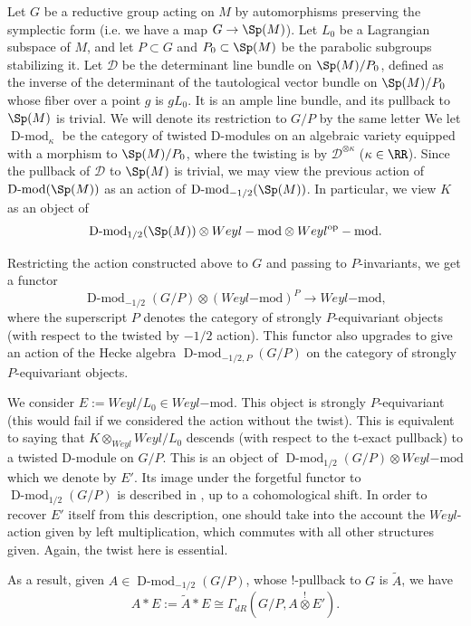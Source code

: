 \documentclass[11pt]{article}
\begin{document}
Let $G$ be a reductive group acting on $M$ by automorphisms preserving the symplectic form (i.e. we have a map $G\to \Sp(M)$).
Let $L_0$ be a Lagrangian subspace of $M$, and let $P\subset G$ and $P_0\subset \Sp(M)$ be the parabolic subgroups stabilizing it.
Let $\mathcal{D}$ be the determinant line bundle on $\Sp(M)/P_0$, defined as the inverse of the determinant of the tautological vector bundle on $\Sp(M)/P_0$ whose fiber over a point $g$ is $gL_0$. It is an ample line bundle, and its pullback to $\Sp(M)$ is trivial. We will denote its restriction to $G/P$ by the same letter
We let $\operatorname{D-mod}_\kappa$ be the category of twisted D-modules on an algebraic variety equipped with a morphism to $\Sp(M)/P_0$, where the twisting is by $\mathcal{D}^{\otimes\kappa}$ ($\kappa\in \RR$).
Since the pullback of $\mathcal{D}$ to $\Sp(M)$ is trivial, we may view the previous action of $\operatorname{D-mod}(\Sp(M))$ as an action of $\operatorname{D-mod}_{-1/2}(\Sp(M))$. In particular, we view $K$ as an object of $$\operatorname{D-mod}_{1/2}(\Sp(M))\otimes Weyl-\mathrm{mod}\otimes Weyl^{\mathrm{op}}-\mathrm{mod}.$$

Restricting the action constructed above to $G$ and passing to $P$-invariants, we get a functor $$\operatorname{D-mod}_{-1/2}(G/P)\otimes (Weyl\mathrm{-mod})^P\to Weyl\mathrm{-mod},$$ where the superscript $P$ denotes the category of strongly $P$-equivariant objects (with respect to the twisted by $-1/2$ action). This functor also upgrades to give an action of the Hecke algebra $\operatorname{D-mod}_{-1/2,P}(G/P)$ on the category of strongly $P$-equivariant objects.

We consider $E:=Weyl / L_0\in Weyl\mathrm{-mod}$.
This object is strongly $P$-equivariant (this would fail if we considered the action without the twist). This is equivalent to saying that $K\otimes _{Weyl} Weyl / L_0$ descends (with respect to the t-exact pullback) to a twisted D-module on $G/P$. This is an object of $\operatorname{D-mod}_{1/2}(G/P)\otimes Weyl\mathrm{-mod}$ which we denote by $E'$. Its image under the forgetful functor to $\operatorname{D-mod}_{1/2}(G/P)$ is described in \cite[§1.3]{Laf}, up to a cohomological shift. In order to recover $E'$ itself from this description, one should take into the account the $Weyl$-action given by left multiplication, which commutes with all other structures given. Again, the twist here is essential.

As a result, given $A\in \operatorname{D-mod}_{-1/2}(G/P)$, whose !-pullback to $G$ is $\tilde{A}$, we have $$A*E:=\tilde{A}*E \cong \Gamma_{dR}(G/P, A\stackrel{!}{\otimes} E').$$
\end{document}
